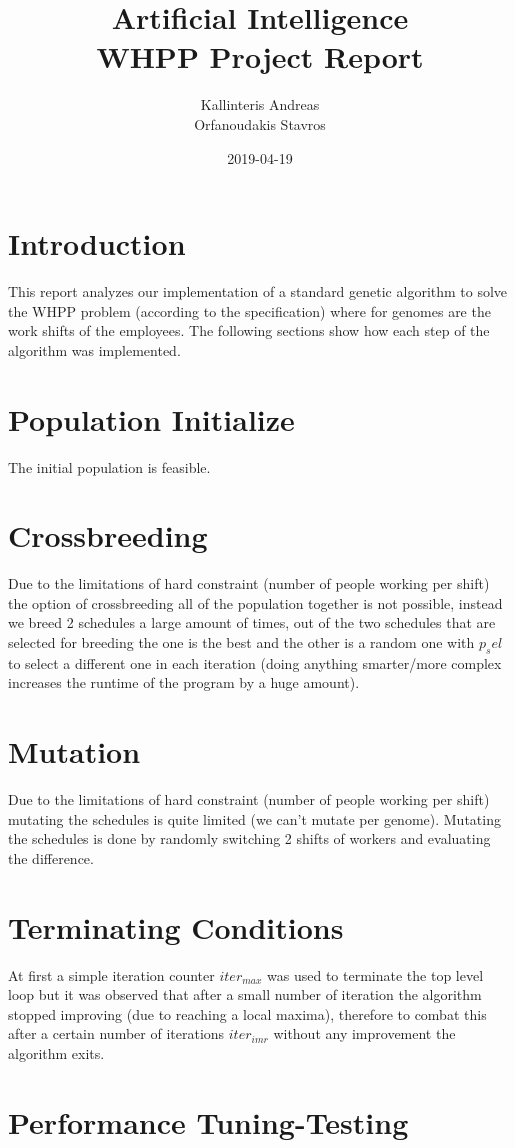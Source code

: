 \documentclass{article}
\title{Artificial Intelligence \\ WHPP Project Report}
\date{2019-04-19}
\author{Kallinteris Andreas\\ Orfanoudakis Stavros}
\begin{document}
\maketitle
\section*{Introduction}
This report analyzes our implementation of a standard genetic algorithm to solve the WHPP problem (according to the specification) where for genomes are the work shifts of the employees.
The following sections show how each step of the algorithm was implemented.
\section*{Population Initialize}
The initial population is feasible.
\section*{Crossbreeding}
Due to the limitations of hard constraint (number of people working per shift) the option of crossbreeding all of the population together is not possible,
instead we breed 2 schedules a large amount of times,
out of the two schedules that are selected for breeding the one is the best and the other is a random one with $p_sel$ to select a different one in each iteration (doing anything smarter/more complex increases the runtime of the program by a huge amount).
\section*{Mutation}
Due to the limitations of hard constraint (number of people working per shift) mutating the schedules is quite limited (we can't mutate per genome).
Mutating the schedules is done by randomly switching 2 shifts of workers and evaluating the difference.
\section*{Terminating Conditions}
At first a simple iteration counter $iter_{max}$ was used to terminate the top level loop but it was observed that after a small number of iteration the algorithm stopped improving (due to reaching a local maxima),
therefore to combat this after a certain number of iterations $iter_{imr}$ without any improvement the algorithm exits.

\section*{Performance Tuning-Testing}
\end{document}

